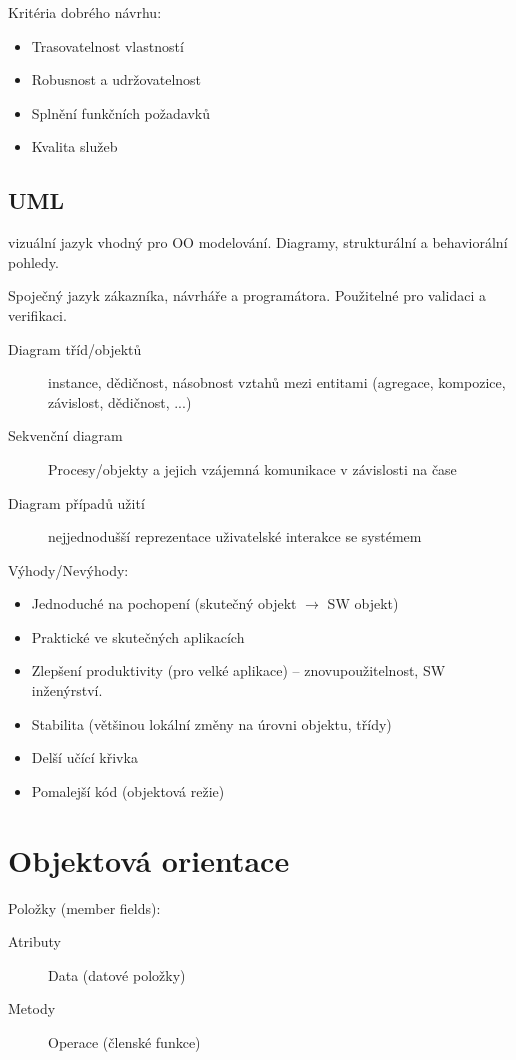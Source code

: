 \documentclass[a4wide]{report}
\begin{document}
Kritéria dobrého návrhu:
\begin{itemize}
	\item Trasovatelnost vlastností
	\item Robusnost a udržovatelnost
	\item Splnění funkčních požadavků
	\item Kvalita služeb
\end{itemize}

\subsection{UML}
vizuální jazyk vhodný pro OO modelování. Diagramy, strukturální a behaviorální pohledy.

Spoječný jazyk zákazníka, návrháře a programátora. Použitelné pro validaci a verifikaci.

\begin{description}
	\item[Diagram tříd/objektů] instance, dědičnost, násobnost vztahů mezi entitami (agregace, kompozice, závislost, dědičnost, ...)
	\item[Sekvenční diagram] Procesy/objekty a jejich vzájemná komunikace v závislosti na čase
	\item[Diagram případů užití] nejjednodušší reprezentace uživatelské interakce se systémem
\end{description}

Výhody/Nevýhody:
\begin{itemize}
	\item Jednoduché na pochopení (skutečný objekt $\to$ SW objekt)
	\item Praktické ve skutečných aplikacích
	\item Zlepšení produktivity (pro velké aplikace) -- znovupoužitelnost, SW inženýrství.
	\item Stabilita (většinou lokální změny na úrovni objektu, třídy)
	\item Delší učící křivka
	\item Pomalejší kód (objektová režie)
\end{itemize}

\section{Objektová orientace}

Položky (member fields):
\begin{description}
	\item[Atributy] Data (datové položky)
	\item[Metody] Operace (členské funkce)
\end{description}
\end{document}
